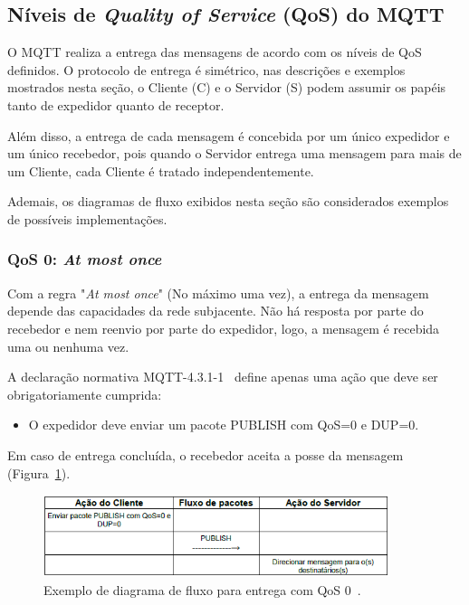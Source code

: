 \subsection{Níveis de \textit{Quality of Service} (QoS) do MQTT} \label{sec:qos}

O MQTT realiza a entrega das mensagens de acordo com os níveis de QoS definidos. O protocolo de entrega é simétrico, nas descrições e exemplos mostrados nesta seção, o Cliente (C) e o Servidor (S) podem assumir os papéis tanto de expedidor quanto de receptor. 

Além disso, a entrega de cada mensagem é concebida por um único expedidor e um único recebedor, pois quando o Servidor entrega uma mensagem para mais de um Cliente, cada Cliente é tratado independentemente.

Ademais, os diagramas de fluxo exibidos nesta seção são considerados exemplos de possíveis implementações.

\subsubsection*{QoS 0: \textit{At most once}}

Com a regra "\textit{At most once}" (No máximo uma vez), a entrega da mensagem depende das capacidades da rede subjacente. Não há resposta por parte do recebedor e nem reenvio por parte do expedidor, logo, a mensagem é recebida uma ou nenhuma vez.

A declaração normativa MQTT-4.3.1-1~\cite{mqttv3.1.1} define apenas uma ação que deve ser obrigatoriamente cumprida:
\begin{itemize}
	\item O expedidor deve enviar um pacote PUBLISH com QoS=0 e DUP=0.
\end{itemize}

Em caso de entrega concluída, o recebedor aceita a posse da mensagem (Figura~\ref{fig:mqtt_qos0}).

\begin{figure}[ht]
	\centering
	\includegraphics[width=0.9\textwidth]{imagens/mqtt_qos0.png}
	\caption{Exemplo de diagrama de fluxo para entrega com QoS 0~\cite{mqttv3.1.1}.
		\label{fig:mqtt_qos0}}
\end{figure}
\FloatBarrier

